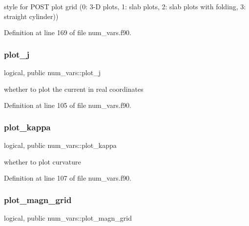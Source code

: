 style for P\+O\+ST plot grid (0\+: 3-\/D plots, 1\+: slab plots, 2\+: slab plots with folding, 3\+: straight cylinder)) 



Definition at line 169 of file num\+\_\+vars.\+f90.

\mbox{\label{namespacenum__vars_aa5519c9217b33a3a677e058723638fa9}} 
\subsubsection{\texorpdfstring{plot\+\_\+j}{plot\_j}}
{\footnotesize\ttfamily logical, public num\+\_\+vars\+::plot\+\_\+j}



whether to plot the current in real coordinates 



Definition at line 105 of file num\+\_\+vars.\+f90.

\mbox{\label{namespacenum__vars_a15a00106d8f59e98ab924f905cf2ddac}} 
\subsubsection{\texorpdfstring{plot\+\_\+kappa}{plot\_kappa}}
{\footnotesize\ttfamily logical, public num\+\_\+vars\+::plot\+\_\+kappa}



whether to plot curvature 



Definition at line 107 of file num\+\_\+vars.\+f90.

\mbox{\label{namespacenum__vars_ad6bbee854ff7479d1d2ded83cda04699}} 
\subsubsection{\texorpdfstring{plot\+\_\+magn\+\_\+grid}{plot\_magn\_grid}}
{\footnotesize\ttfamily logical, public num\+\_\+vars\+::plot\+\_\+magn\+\_\+grid}



